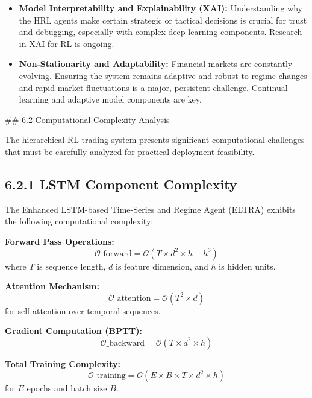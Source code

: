 \documentclass[11pt,a4paper]{article}
\begin{document}
\begin{itemize}
\item   \textbf{Model Interpretability and Explainability (XAI):} Understanding why the HRL agents make certain strategic or tactical decisions is crucial for trust and debugging, especially with complex deep learning components. Research in XAI for RL is ongoing.
\item   \textbf{Non-Stationarity and Adaptability:} Financial markets are constantly evolving. Ensuring the system remains adaptive and robust to regime changes and rapid market fluctuations is a major, persistent challenge. Continual learning and adaptive model components are key.
\end{itemize}
\#\# 6.2 Computational Complexity Analysis

The hierarchical RL trading system presents significant computational challenges that must be carefully analyzed for practical deployment feasibility.

\subsection{6.2.1 LSTM Component Complexity}

The Enhanced LSTM-based Time-Series and Regime Agent (ELTRA) exhibits the following computational complexity:

\textbf{Forward Pass Operations:}
\begin{equation}
\mathcal{O}\_{\text{forward}} = \mathcal{O}(T \times d^2 \times h + h^3)
\end{equation}
where $T$ is sequence length, $d$ is feature dimension, and $h$ is hidden units.

\textbf{Attention Mechanism:}
\begin{equation}
\mathcal{O}\_{\text{attention}} = \mathcal{O}(T^2 \times d)
\end{equation}
for self-attention over temporal sequences.

\textbf{Gradient Computation (BPTT):}
\begin{equation}
\mathcal{O}\_{\text{backward}} = \mathcal{O}(T \times d^2 \times h)
\end{equation}

\textbf{Total Training Complexity:}
\begin{equation}
\mathcal{O}\_{\text{training}} = \mathcal{O}(E \times B \times T \times d^2 \times h)
\end{equation}
for $E$ epochs and batch size $B$.
\end{document}
